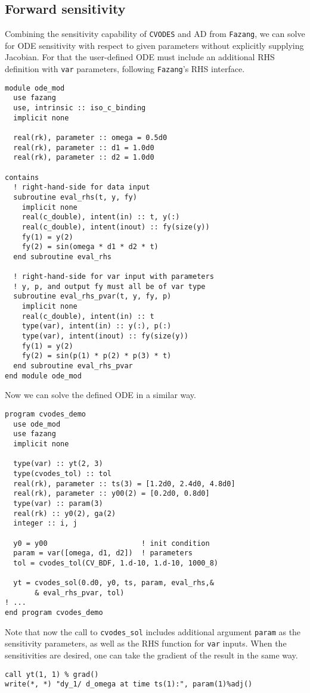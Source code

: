 \documentclass[12pt, reqno, oneside]{amsbook}
\numberwithin{equation}{chapter}
\begin{document}
\subsection{Forward sensitivity}
\label{sec:orgadfef3f}
Combining the sensitivity capability of \texttt{CVODES} and AD from \texttt{Fazang},
we can solve for ODE sensitivity with respect to given parameters
without explicitly supplying Jacobian. For that the user-defined ODE
must include an additional RHS definition with \texttt{var} parameters,
following \texttt{Fazang}'s RHS interface.
\begin{verbatim}
module ode_mod
  use fazang
  use, intrinsic :: iso_c_binding
  implicit none

  real(rk), parameter :: omega = 0.5d0
  real(rk), parameter :: d1 = 1.0d0
  real(rk), parameter :: d2 = 1.0d0

contains
  ! right-hand-side for data input
  subroutine eval_rhs(t, y, fy)
    implicit none
    real(c_double), intent(in) :: t, y(:)
    real(c_double), intent(inout) :: fy(size(y))
    fy(1) = y(2)
    fy(2) = sin(omega * d1 * d2 * t)
  end subroutine eval_rhs

  ! right-hand-side for var input with parameters
  ! y, p, and output fy must all be of var type
  subroutine eval_rhs_pvar(t, y, fy, p)
    implicit none
    real(c_double), intent(in) :: t
    type(var), intent(in) :: y(:), p(:)
    type(var), intent(inout) :: fy(size(y))
    fy(1) = y(2)
    fy(2) = sin(p(1) * p(2) * p(3) * t)
  end subroutine eval_rhs_pvar
end module ode_mod
\end{verbatim}
Now we can solve the defined ODE in a similar way.
\begin{verbatim}
program cvodes_demo
  use ode_mod
  use fazang
  implicit none

  type(var) :: yt(2, 3)
  type(cvodes_tol) :: tol
  real(rk), parameter :: ts(3) = [1.2d0, 2.4d0, 4.8d0]
  real(rk), parameter :: y00(2) = [0.2d0, 0.8d0]
  type(var) :: param(3)
  real(rk) :: y0(2), ga(2)
  integer :: i, j

  y0 = y00                      ! init condition
  param = var([omega, d1, d2])  ! parameters
  tol = cvodes_tol(CV_BDF, 1.d-10, 1.d-10, 1000_8)

  yt = cvodes_sol(0.d0, y0, ts, param, eval_rhs,&
       & eval_rhs_pvar, tol)
! ...
end program cvodes_demo
\end{verbatim}
Note that now the call to \texttt{cvodes\_sol} includes additional argument
\texttt{param} as the sensitivity parameters, as well as the RHS function for
\texttt{var} inputs. When the sensitivities are desired, one can take the
gradient of the result in the same way.
\begin{verbatim}
call yt(1, 1) % grad()
write(*, *) "dy_1/ d_omega at time ts(1):", param(1)%adj()
\end{verbatim}
\end{document}
